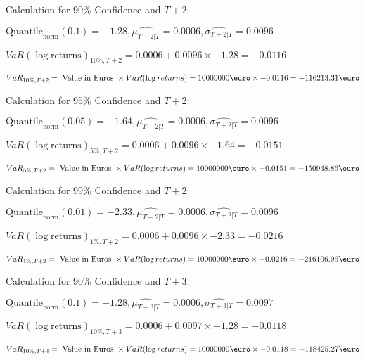 Calculation for 90\% Confidence and $T+2$:

\indent\indent $\text{Quantile}_\text{norm}(0.1) = -1.28,\hat{\mu_{T+2|T}} = 0.0006, \hat{\sigma_{T+2|T}} = 0.0096$

\indent\indent $VaR(\log \text{returns})_{10\%, T + 2} = 0.0006 + 0.0096\times-1.28 = -0.0116$

\indent\indent $VaR_{10\%, T + 2} = \text{ Value in Euros } \times VaR(\log returns) = 10 000 000 \text{\euro} \times-0.0116 = -116213.31 \text{\euro}$\newline




Calculation for 95\% Confidence and $T+2$:

\indent\indent $\text{Quantile}_\text{norm}(0.05) = -1.64,\hat{\mu_{T+2|T}} = 0.0006, \hat{\sigma_{T+2|T}} = 0.0096$

\indent\indent $VaR(\log \text{returns})_{5\%, T + 2} = 0.0006 + 0.0096\times-1.64 = -0.0151$

\indent\indent $VaR_{5\%, T + 2} = \text{ Value in Euros } \times VaR(\log returns) = 10 000 000 \text{\euro} \times-0.0151 = -150948.86 \text{\euro}$\newline




Calculation for 99\% Confidence and $T+2$:

\indent\indent $\text{Quantile}_\text{norm}(0.01) = -2.33,\hat{\mu_{T+2|T}} = 0.0006, \hat{\sigma_{T+2|T}} = 0.0096$

\indent\indent $VaR(\log \text{returns})_{1\%, T + 2} = 0.0006 + 0.0096\times-2.33 = -0.0216$

\indent\indent $VaR_{1\%, T + 2} = \text{ Value in Euros } \times VaR(\log returns) = 10 000 000 \text{\euro} \times-0.0216 = -216106.96 \text{\euro}$\newline




Calculation for 90\% Confidence and $T+3$:

\indent\indent $\text{Quantile}_\text{norm}(0.1) = -1.28,\hat{\mu_{T+3|T}} = 0.0006, \hat{\sigma_{T+3|T}} = 0.0097$

\indent\indent $VaR(\log \text{returns})_{10\%, T + 3} = 0.0006 + 0.0097\times-1.28 = -0.0118$

\indent\indent $VaR_{10\%, T + 3} = \text{ Value in Euros } \times VaR(\log returns) = 10 000 000 \text{\euro} \times-0.0118 = -118425.27 \text{\euro}$\newline




